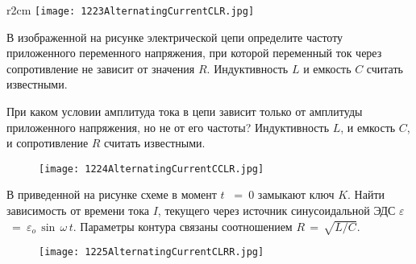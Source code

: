 \begin{wrapfigure}{r}{2cm}
\texttt{[image: 1223AlternatingCurrentCLR.jpg]}
\end{wrapfigure}

\AddProb В изображенной на рисунке электрической цепи определите частоту приложенного переменного напряжения, 
при которой переменный ток через сопротивление не зависит от значения $R$. Индуктивность $L$ и емкость $C$ считать известными.

\AddProb При каком условии амплитуда тока в цепи зависит только от амплитуды приложенного напряжения, 
но не от его частоты? Индуктивность $L$, и емкость $C$, и сопротивление $R$ считать известными.

\begin{figure}[!h]
\texttt{[image: 1224AlternatingCurrentCCLR.jpg]}
\end{figure}

\AddProb В приведенной на рисунке схеме в момент $t$~ =~0 замыкают ключ $K$. Найти зависимость от времени тока $I$, 
текущего через источник синусоидальной ЭДС {\Large $\varepsilon$}~=~{\Large $\varepsilon_o$}\,$\sin\,\omega\,t$.
Параметры контура связаны соотношением $R\,=\,\sqrt{L/C}$.

\begin{figure}[!h]
\texttt{[image: 1225AlternatingCurrentCLRR.jpg]}
\end{figure}